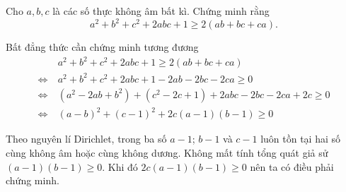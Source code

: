 \begin{problem}
	Cho $a, b, c$ là các số thực không âm bất kì. Chứng minh rằng
	\[
		a^2 + b^2 + c^2 + 2abc + 1 \ge 2(ab + bc + ca).
	\]
	\solution

	Bất đẳng thức cần chứng minh tương đương
	\begin{align*}
		&a^2 + b^2 + c^2 + 2abc + 1 \ge 2(ab + bc + ca) \\
		\Leftrightarrow\ &a^2 + b^2 + c^2 + 2abc + 1 - 2ab - 2bc - 2ca \ge 0 \\
		\Leftrightarrow\ &(a^2 - 2ab + b^2) + (c^2 - 2c + 1) + 2abc - 2bc - 2ca + 2c \ge 0 \\ 
		\Leftrightarrow\ &(a - b)^2 + (c - 1)^2 + 2c(a - 1)(b - 1) \ge 0
	\end{align*}

	Theo nguyên lí Dirichlet, trong ba số $a - 1$; $b - 1$ và $c - 1$ luôn tồn tại hai số cùng không âm hoặc cùng không dương. Không mất tính tổng quát giả sử $(a - 1)(b - 1) \ge 0$. Khi đó $2c(a - 1)(b - 1) \ge 0$ nên ta có điều phải chứng minh.
\end{problem}